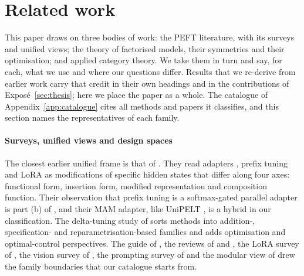 \section{Related work}\label{sec:related}

This paper draws on three bodies of work: the PEFT literature, with its surveys and unified views; the theory of factorised models, their symmetries and their optimisation; and applied category theory. We take them in turn and say, for each, what we use and where our questions differ. Results that we re-derive from earlier work carry that credit in their own headings and in the contributions of Exposé~\ref{sec:thesis}; here we place the paper as a whole. The catalogue of Appendix~\ref{app:catalogue} cites all \nMethods{} methods and \nPapers{} papers it classifies, and this section names the representatives of each family.

\paragraph{Surveys, unified views and design spaces}
The closest earlier unified frame is that of \citet{he2021unified}. They read adapters \citep{houlsby2019parameter}, prefix tuning \citep{li2021prefix} and LoRA \citep{hu2021lora} as modifications of specific hidden states that differ along four axes: functional form, insertion form, modified representation and composition function. Their observation that prefix tuning is a softmax-gated parallel adapter is part (b) of , and their MAM adapter, like UniPELT \citep{mao2021unipelt}, is a hybrid in our classification. The delta-tuning study of \citet{ding2022parameter} sorts methods into addition-, specification- and reparametrisation-based families and adds optimisation and optimal-control perspectives. The guide of \citet{lialin2023scaling}, the reviews of \citet{xu2023parameter} and \citet{han2024parameter}, the LoRA survey of \citet{mao2024survey}, the vision survey of \citet{xin2024parameter}, the prompting survey of \citet{liu2021pre} and the modular view of \citet{pfeiffer2023modular} drew the family boundaries that our catalogue starts from.

